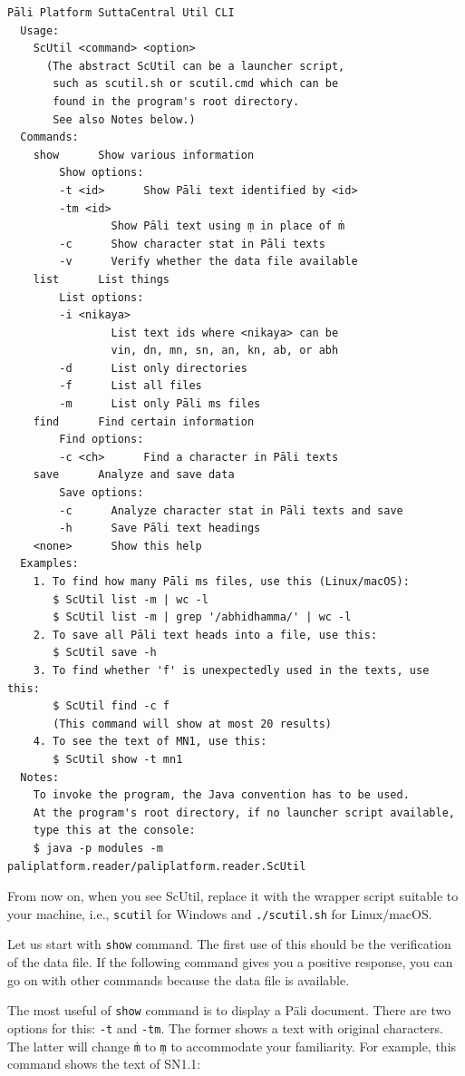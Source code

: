 {\footnotesize
\begin{verbatim}
Pāli Platform SuttaCentral Util CLI
  Usage:
    ScUtil <command> <option>
      (The abstract ScUtil can be a launcher script,
       such as scutil.sh or scutil.cmd which can be
       found in the program's root directory.
       See also Notes below.)
  Commands:
    show      Show various information
        Show options:
        -t <id>      Show Pāli text identified by <id>
        -tm <id>
                Show Pāli text using ṃ in place of ṁ
        -c      Show character stat in Pāli texts
        -v      Verify whether the data file available
    list      List things
        List options:
        -i <nikaya>
                List text ids where <nikaya> can be
                vin, dn, mn, sn, an, kn, ab, or abh
        -d      List only directories
        -f      List all files
        -m      List only Pāli ms files
    find      Find certain information
        Find options:
        -c <ch>      Find a character in Pāli texts
    save      Analyze and save data
        Save options:
        -c      Analyze character stat in Pāli texts and save
        -h      Save Pāli text headings
    <none>      Show this help
  Examples:
    1. To find how many Pāli ms files, use this (Linux/macOS):
       $ ScUtil list -m | wc -l
       $ ScUtil list -m | grep '/abhidhamma/' | wc -l
    2. To save all Pāli text heads into a file, use this:
       $ ScUtil save -h
    3. To find whether 'f' is unexpectedly used in the texts, use this:
       $ ScUtil find -c f
       (This command will show at most 20 results)
    4. To see the text of MN1, use this:
       $ ScUtil show -t mn1
  Notes:
    To invoke the program, the Java convention has to be used.
    At the program's root directory, if no launcher script available,
    type this at the console: 
    $ java -p modules -m paliplatform.reader/paliplatform.reader.ScUtil
\end{verbatim}
}

From now on, when you see ScUtil, replace it with the wrapper script suitable to your machine, i.e., \texttt{scutil} for Windows and \texttt{./scutil.sh} for Linux/macOS.

Let us start with \texttt{show} command. The first use of this should be the verification of the data file. If the following command gives you a positive response, you can go on with other commands because the data file is available.


The most useful of \texttt{show} command is to display a Pāli document. There are two options for this: \texttt{-t} and \texttt{-tm}. The former shows a text with original characters. The latter will change \texttt{ṁ} to \texttt{ṃ} to accommodate your familiarity. For example, this command shows the text of SN1.1:

